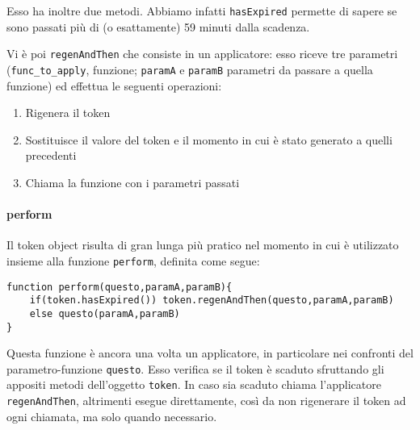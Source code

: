Esso ha inoltre due metodi.
Abbiamo infatti \verb|hasExpired| permette di sapere se sono passati più di (o esattamente) 59 minuti dalla scadenza.


Vi è poi \verb|regenAndThen| che consiste in un applicatore: esso riceve tre parametri (\verb|func_to_apply|, funzione; \verb|paramA| e \verb|paramB| parametri da passare a quella funzione) ed effettua le seguenti operazioni:

\begin{enumerate}
    \item Rigenera il token
    \item Sostituisce il valore del token e il momento in cui è stato generato a quelli precedenti
    \item Chiama la funzione con i parametri passati
\end{enumerate}
\paragraph{perform} Il token object risulta di gran lunga più pratico nel momento in cui è utilizzato insieme alla funzione \verb|perform|, definita come segue:
\begin{lstlisting}
function perform(questo,paramA,paramB){
    if(token.hasExpired()) token.regenAndThen(questo,paramA,paramB)
    else questo(paramA,paramB)
}
\end{lstlisting}
Questa funzione è ancora una volta un applicatore, in particolare nei confronti del parametro-funzione \verb|questo|. Esso verifica se il token è scaduto sfruttando gli appositi metodi dell'oggetto \verb|token|. In caso sia scaduto chiama l'applicatore \verb|regenAndThen|, altrimenti esegue direttamente, così da non rigenerare il token ad ogni chiamata, ma solo quando necessario.

\newpage